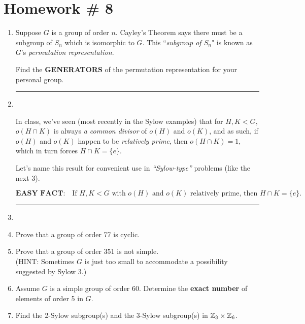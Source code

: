 \section{Homework \# 8}
\label{sec:HW8}

\begin{enumerate}
    \item Suppose \( G \) is a group of order \( n \). Cayley’s Theorem says there must be a subgroup of \( S_n \) which is isomorphic to \( G \).  
    This ``\textit{subgroup of \( S_n \)}" is known as \( G \)'s \textit{permutation representation}.  

    Find the \textbf{GENERATORS} of the permutation representation for your personal group.  \\ \steezybreak

    \item[] \rule{\textwidth}{0.4pt} \\ \steezybreak

    In class, we’ve seen (most recently in the Sylow examples) that for \( H, K < G \), \( o(H \cap K) \) is always \textit{a common divisor} of \( o(H) \) and \( o(K) \),  
    and as such, if \( o(H) \) and \( o(K) \) happen to be \textit{relatively prime}, then  
    \( o(H \cap K) = 1 \), which in turn forces \( H \cap K = \{e\} \).  \\ \steezybreak

    Let’s name this result for convenient use in  
    \textit{“Sylow-type”} problems (like the next 3).  

    \[
    \boxed{\textbf{EASY FACT:} \quad \text{If } H, K < G \text{ with } o(H) \text{ and } o(K) \text{ relatively prime, then } H \cap K = \{e\}.}
    \]

    \item[] \rule{\textwidth}{0.4pt} \\ \steezybreak

    \item Prove that a group of order 77 is cyclic.  \\ \steezybreak

    \item Prove that a group of order 351 is not simple.  \\
    (HINT: Sometimes \( G \) is just too small to accommodate a possibility suggested by Sylow \( 3 \).)  \\ \steezybreak

    \item Assume \( G \) is a simple group of order 60.  
    Determine the \textbf{exact number} of elements of order 5 in \( G \).  \\ \steezybreak

    \item Find the 2-Sylow subgroup(s) and the 3-Sylow subgroup(s) in \( {\mathbb{ Z}}_3 \times {\mathbb{ Z}}_6 \).  

\end{enumerate}
\newpage 


